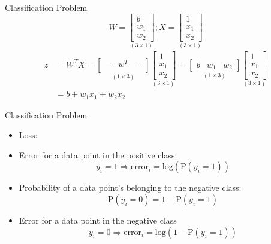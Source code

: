 \documentclass[pdflatex,compress,mathserif]{beamer}
\begin{document}
\begin{frame}{Classification Problem}
	$$
	W =
	\underset{(3 \times 1)}{
		\begin{bmatrix}
			b \\
			w_1 \\
			w_2
	\end{bmatrix}};
	X = 
	\underset{(3 \times 1)}{
		\begin{bmatrix}
			1 \\
			x_1 \\
			x_2
	\end{bmatrix}}
	$$
	$$
	\begin{aligned}
		z
		& = W^T X
		=
		\underset{(1 \times 3)}{
			\begin{bmatrix}
				- & w^{T} & -\\
		\end{bmatrix}}
		\underset{(3 \times 1)}{
			\begin{bmatrix}
				1 \\
				x_1 \\
				x_2
		\end{bmatrix}}
		= \underset{(1 \times 3)}{
			\begin{bmatrix}
				b & w_1 & w_2
		\end{bmatrix}}
		\underset{(3 \times 1)}{
			\begin{bmatrix}
				1 \\
				x_1 \\
				x_2
		\end{bmatrix}}\\
		& = b + w_1x_1 + w_2x_2
	\end{aligned}
	$$
\end{frame}

\begin{frame}{Classification Problem}
	\begin{itemize}
		\item Loss:
		\item Error for a data point in the positive class:
		$$
		y_i = 1 \Rightarrow \text{error}_i=\text{log}(\text{P}(y_i=1))
		$$
		\item Probability of a data point’s belonging to the negative class:
		$$
		\text{P}(y_i=0)=1-\text{P}(y_i=1)
		$$
		\item Error for a data point in the negative class
		$$
		y_i = 0 \Rightarrow \text{error}_i=\text{log}(1-\text{P}(y_i=1))
		$$
	\end{itemize}
\end{frame}
\end{document}
